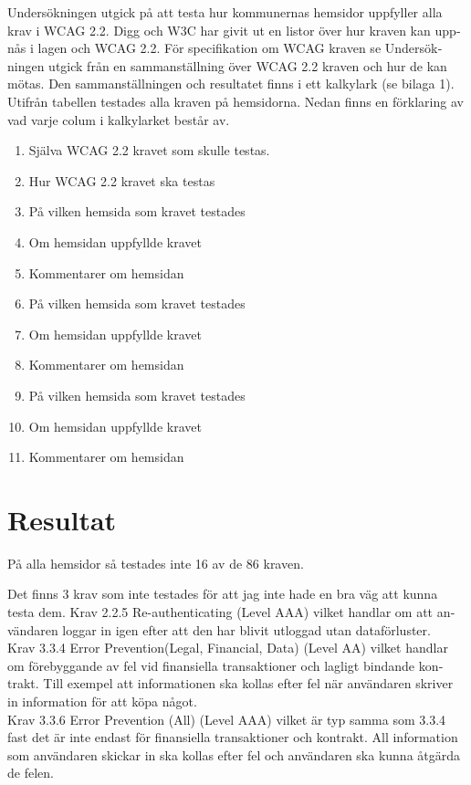 \documentclass[11p]{article}
\begin{document}
\begin{otherlanguage}{swedish}
    Undersökningen utgick på att testa hur kommunernas hemsidor uppfyller alla krav i WCAG 2.2.
    Digg och W3C har givit ut en listor över hur kraven kan uppnås i lagen och WCAG 2.2.
    För specifikation om WCAG kraven se \textcite{WCAG_2.2}
    Undersökningen utgick från en sammanställning över WCAG 2.2 kraven och hur de kan mötas.
    Den sammanställningen och resultatet finns i ett kalkylark (se bilaga 1).
    Utifrån tabellen testades alla kraven på hemsidorna.
    Nedan finns en förklaring av vad varje colum i kalkylarket består av.
    \begin{enumerate}
        \item Själva WCAG 2.2 kravet som skulle testas.
        \item Hur WCAG 2.2 kravet ska testas
        \item På vilken hemsida som kravet testades
        \item Om hemsidan uppfyllde kravet
        \item Kommentarer om hemsidan
        \item På vilken hemsida som kravet testades
        \item Om hemsidan uppfyllde kravet
        \item Kommentarer om hemsidan
        \item På vilken hemsida som kravet testades
        \item Om hemsidan uppfyllde kravet
        \item Kommentarer om hemsidan
    \end{enumerate}

    \section{Resultat}

    På alla hemsidor så testades inte 16 av de 86 kraven.

    Det finns 3 krav som inte testades för att jag inte hade en bra väg att kunna testa dem.
    Krav 2.2.5 Re-authenticating (Level AAA) vilket handlar om att användaren loggar in igen efter att den har blivit utloggad utan dataförluster.
   \\ Krav 3.3.4 Error Prevention(Legal, Financial, Data) (Level AA) vilket handlar om förebyggande av fel vid finansiella transaktioner och lagligt bindande kontrakt.
    Till exempel att informationen ska kollas efter fel när användaren skriver in information för att köpa något.
  \\  Krav 3.3.6 Error Prevention (All) (Level AAA) vilket är typ samma som 3.3.4 fast det är inte endast för finansiella transaktioner och kontrakt.
    All information som användaren skickar in ska kollas efter fel och användaren ska kunna åtgärda de felen.


\end{otherlanguage}
\end{document}
